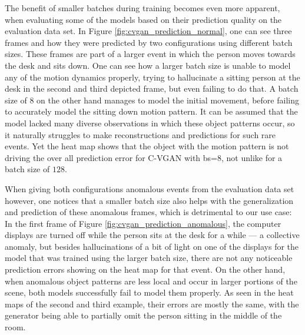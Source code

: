 The benefit of smaller batches during training becomes even more apparent, when evaluating some of the models based on their prediction quality on the evaluation data set. In Figure \ref{fig:cvgan_prediction_normal}, one can see three frames and how they were predicted by two configurations using different batch sizes. These frames are part of a larger event in which the person moves towards the desk and sits down. One can see how a larger batch size is unable to model any of the motion dynamics properly, trying to hallucinate a sitting person at the desk in the second and third depicted frame, but even failing to do that. A batch size of $8$ on the other hand manages to model the initial movement, before failing to accurately model the sitting down motion pattern. It can be assumed that the model lacked many diverse observations in which these object patterns occur, so it naturally struggles to make reconstructions and predictions for such rare events. Yet the heat map shows that the object with the motion pattern is not driving the over all prediction error for C-VGAN with bs=$8$, not unlike for a batch size of $128$. 

When giving both configurations anomalous events from the evaluation data set however, one notices that a smaller batch size also helps with the generalization and prediction of these anomalous frames, which is detrimental to our use case: In the first frame of Figure \ref{fig:cvgan_prediction_anomalous}, the computer displays are turned off while the person sits at the desk for a while --- a collective anomaly, but besides hallucinations of a bit of light on one of the displays for the model that was trained using the larger batch size, there are not any noticeable prediction errors showing on the heat map for that event. On the other hand, when anomalous object patterns are less local and occur in larger portions of the scene, both models successfully fail to model them properly. As seen in the heat maps of the second and third example, their errors are mostly the same, with the generator being able to partially omit the person sitting in the middle of the room.

